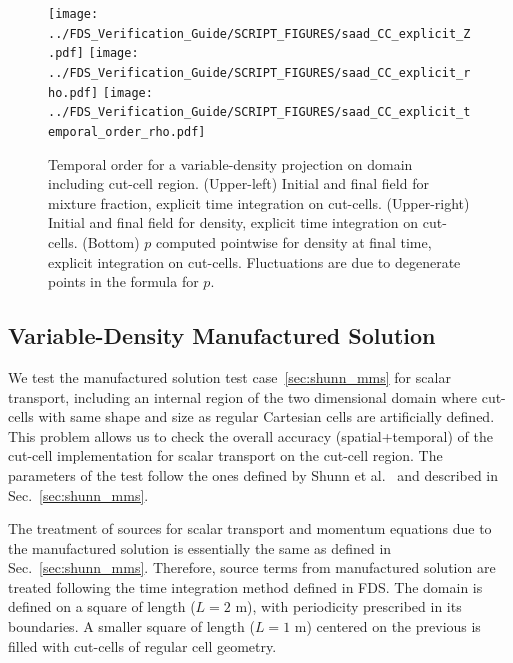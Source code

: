 \documentclass[11pt]{book}
\begin{document}
\begin{figure}[ht]
\centering
\texttt{[image: ../FDS\_Verification\_Guide/SCRIPT\_FIGURES/saad\_CC\_explicit\_Z.pdf]}
\texttt{[image: ../FDS\_Verification\_Guide/SCRIPT\_FIGURES/saad\_CC\_explicit\_rho.pdf]}
\texttt{[image: ../FDS\_Verification\_Guide/SCRIPT\_FIGURES/saad\_CC\_explicit\_temporal\_order\_rho.pdf]}
\caption[The {\ct saad CC} temporal order test case]{Temporal order for a variable-density projection on domain including cut-cell region.  (Upper-left) Initial and final field for mixture fraction, explicit time integration on cut-cells.  (Upper-right) Initial and final field for density, explicit time integration on cut-cells.  (Bottom) $p$ computed pointwise for density at final time, explicit integration on cut-cells. Fluctuations are due to degenerate points in the formula for $p$.}\label{fig:saad_cc_temporal_order}
\end{figure}


\subsection{Variable-Density Manufactured Solution}

\label{sec:shunn_cc_mms}


We test the manufactured solution test case~\ref{sec:shunn_mms} for scalar transport, including an internal region of the two dimensional domain where cut-cells with same shape and size as regular Cartesian cells are artificially defined. This problem allows us to check the overall accuracy (spatial+temporal) of the cut-cell implementation for scalar transport on the cut-cell region.
The parameters of the test follow the ones defined by Shunn et al.~\cite{Shunn:2012} and described in Sec.~\ref{sec:shunn_mms}.

The treatment of sources for scalar transport and momentum equations due to the manufactured solution is essentially the same as defined in Sec.~\ref{sec:shunn_mms}. Therefore, source terms from manufactured solution are treated following the time integration method defined in FDS.
The domain is defined on a square of length ($L=2$ m), with periodicity prescribed in its boundaries. A smaller square of length ($L=1$ m) centered on the previous is filled with cut-cells of regular cell geometry.
\end{document}
